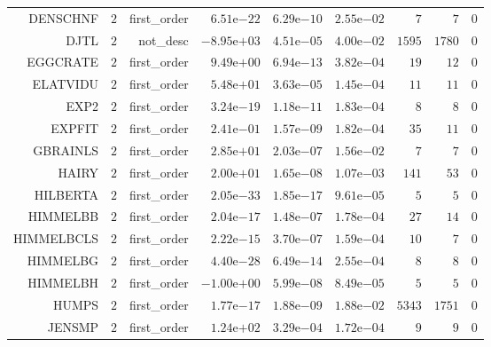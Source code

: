 \begin{longtable}{rrrrrrrrr}
DENSCHNF & \(     2\) & first\_order & \( 6.51\)e\(-22\) & \( 6.29\)e\(-10\) & \( 2.55\)e\(-02\) & \(     7\) & \(     7\) & \(     0\) \\
DJTL & \(     2\) & not\_desc & \(-8.95\)e\(+03\) & \( 4.51\)e\(-05\) & \( 4.00\)e\(-02\) & \(  1595\) & \(  1780\) & \(     0\) \\
EGGCRATE & \(     2\) & first\_order & \( 9.49\)e\(+00\) & \( 6.94\)e\(-13\) & \( 3.82\)e\(-04\) & \(    19\) & \(    12\) & \(     0\) \\
ELATVIDU & \(     2\) & first\_order & \( 5.48\)e\(+01\) & \( 3.63\)e\(-05\) & \( 1.45\)e\(-04\) & \(    11\) & \(    11\) & \(     0\) \\
EXP2 & \(     2\) & first\_order & \( 3.24\)e\(-19\) & \( 1.18\)e\(-11\) & \( 1.83\)e\(-04\) & \(     8\) & \(     8\) & \(     0\) \\
EXPFIT & \(     2\) & first\_order & \( 2.41\)e\(-01\) & \( 1.57\)e\(-09\) & \( 1.82\)e\(-04\) & \(    35\) & \(    11\) & \(     0\) \\
GBRAINLS & \(     2\) & first\_order & \( 2.85\)e\(+01\) & \( 2.03\)e\(-07\) & \( 1.56\)e\(-02\) & \(     7\) & \(     7\) & \(     0\) \\
HAIRY & \(     2\) & first\_order & \( 2.00\)e\(+01\) & \( 1.65\)e\(-08\) & \( 1.07\)e\(-03\) & \(   141\) & \(    53\) & \(     0\) \\
HILBERTA & \(     2\) & first\_order & \( 2.05\)e\(-33\) & \( 1.85\)e\(-17\) & \( 9.61\)e\(-05\) & \(     5\) & \(     5\) & \(     0\) \\
HIMMELBB & \(     2\) & first\_order & \( 2.04\)e\(-17\) & \( 1.48\)e\(-07\) & \( 1.78\)e\(-04\) & \(    27\) & \(    14\) & \(     0\) \\
HIMMELBCLS & \(     2\) & first\_order & \( 2.22\)e\(-15\) & \( 3.70\)e\(-07\) & \( 1.59\)e\(-04\) & \(    10\) & \(     7\) & \(     0\) \\
HIMMELBG & \(     2\) & first\_order & \( 4.40\)e\(-28\) & \( 6.49\)e\(-14\) & \( 2.55\)e\(-04\) & \(     8\) & \(     8\) & \(     0\) \\
HIMMELBH & \(     2\) & first\_order & \(-1.00\)e\(+00\) & \( 5.99\)e\(-08\) & \( 8.49\)e\(-05\) & \(     5\) & \(     5\) & \(     0\) \\
HUMPS & \(     2\) & first\_order & \( 1.77\)e\(-17\) & \( 1.88\)e\(-09\) & \( 1.88\)e\(-02\) & \(  5343\) & \(  1751\) & \(     0\) \\
JENSMP & \(     2\) & first\_order & \( 1.24\)e\(+02\) & \( 3.29\)e\(-04\) & \( 1.72\)e\(-04\) & \(     9\) & \(     9\) & \(     0\) \\

\end{longtable}
